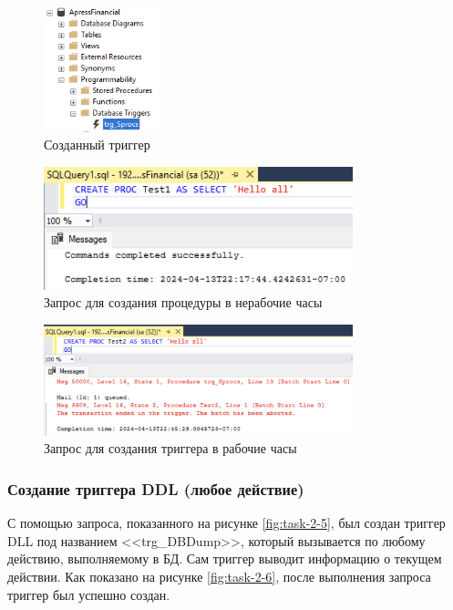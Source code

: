\documentclass[a4paper, 14pt]{extarticle}
\begin{document}
\begin{figure}[H]
  \centering
  \includegraphics[width=0.3\textwidth]{images/task-2/2.png}
  \caption{Созданный триггер}
  \label{fig:task-2-2}
\end{figure}

\begin{figure}[H]
  \centering
  \includegraphics[width=0.8\textwidth]{images/task-2/3.png}
  \caption{Запрос для создания процедуры в нерабочие часы}
  \label{fig:task-2-3}
\end{figure}

\begin{figure}[H]
  \centering
  \includegraphics[width=0.8\textwidth]{images/task-2/4.png}
  \caption{Запрос для создания триггера в рабочие часы}
  \label{fig:task-2-4}
\end{figure}

\subsubsection{Создание триггера DDL (любое действие)}

С помощью запроса, показанного на рисунке \ref{fig:task-2-5}, был создан триггер
DLL под названием <<\foreignlanguage{english}{trg\_DBDump}>>, который вызывается
по любому действию, выполняемому в БД. Сам триггер выводит информацию о текущем
действии. Как показано на рисунке \ref{fig:task-2-6}, после выполнения запроса
триггер был успешно создан.
\end{document}
